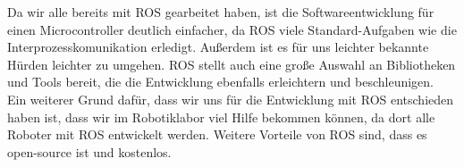 \begin{flushleft}
    Da wir alle bereits mit ROS gearbeitet haben, ist die Softwareentwicklung für einen Microcontroller deutlich einfacher, da ROS viele Standard-Aufgaben wie die Interprozesskomunikation erledigt. Außerdem ist es für uns leichter bekannte Hürden leichter zu umgehen.
    ROS stellt auch eine große Auswahl an Bibliotheken und Tools bereit, die die Entwicklung ebenfalls erleichtern und beschleunigen.\\
    
    Ein weiterer Grund dafür, dass wir uns für die Entwicklung mit ROS entschieden haben ist, dass wir im Robotiklabor viel Hilfe bekommen können, da dort alle Roboter mit ROS entwickelt werden.
    Weitere Vorteile von ROS sind, dass es open-source ist und kostenlos.

    
\end{flushleft}